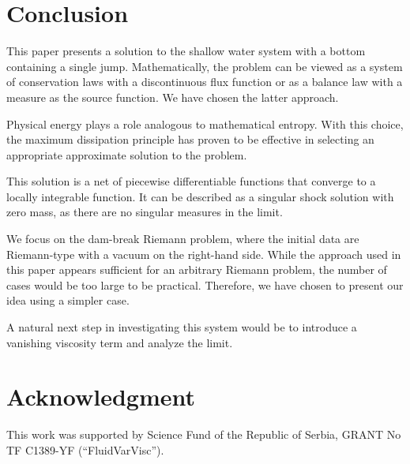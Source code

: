 \documentclass{article}
\theoremstyle{plain}
\theoremstyle{definition}
\theoremstyle{remark}
\begin{document}
\section*{Conclusion}

This paper presents a solution to the shallow water system with a bottom containing a single jump.
Mathematically, the problem can be viewed as a system of conservation laws with
a discontinuous flux function or as a balance law with a measure as the source function.
We have chosen the latter approach.

Physical energy plays a role analogous to mathematical entropy.
With this choice, the maximum dissipation principle has proven to be effective
in selecting an appropriate approximate solution to the problem.

This solution is a net of piecewise differentiable functions that converge to
a locally integrable function. It can be described as a singular shock solution with zero mass,
as there are no singular measures in the limit.

We focus on the dam-break Riemann problem, where the initial data are Riemann-type with
a vacuum on the right-hand side. While the approach used in this paper appears sufficient
for an arbitrary Riemann problem, the number of cases would be too large to be practical.
Therefore, we have chosen to present our idea using a simpler case.

A natural next step in investigating this system would be to introduce
a vanishing viscosity term and analyze the limit. 

\section*{Acknowledgment}
This work was supported by 
Science Fund of the Republic of Serbia, GRANT No TF C1389-YF (“FluidVarVisc”).
\end{document}
